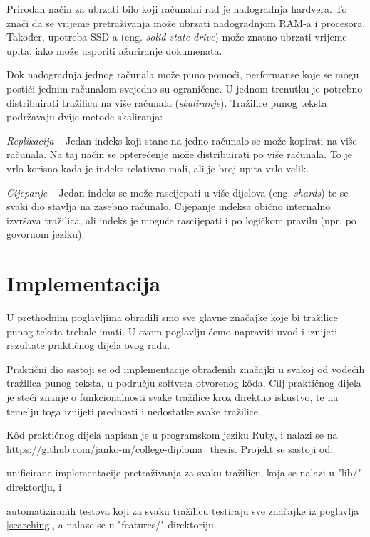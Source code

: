 \documentclass[a4paper,twoside,12pt]{scrreprt}
\begin{document}
Prirodan način za ubrzati bilo koji računalni rad je nadogradnja hardvera. To znači da se vrijeme pretraživanja može ubrzati nadogradnjom RAM-a i procesora. Također, upotreba SSD-a (eng. \textit{solid state drive}) može znatno ubrzati vrijeme upita, iako može usporiti ažuriranje dokumenata.

Dok nadogradnja jednog računala može puno pomoći, performanse koje se mogu postići jednim računalom svejedno su ograničene. U jednom trenutku je potrebno distribuirati tražilicu na više računala (\textit{skaliranje}). Tražilice punog teksta podržavaju dvije metode skaliranja:

\begin{compactenum}
  \item \textit{Replikacija} – Jedan indeks koji stane na jedno računalo se može kopirati na više računala. Na taj način se opterećenje može distribuirati po više računala. To je vrlo korisno kada je indeks relativno mali, ali je broj upita vrlo velik.
  \item \textit{Cijepanje} – Jedan indeks se može rascijepati u više dijelova (eng. \textit{shards}) te se svaki dio stavlja na zasebno računalo. Cijepanje indeksa obično internalno izvršava tražilica, ali indeks je moguće rascijepati i po logičkom pravilu (npr. po govornom jeziku).
\end{compactenum}

\chapter{Implementacija}

U prethodnim poglavljima obradili smo sve glavne značajke koje bi tražilice punog teksta trebale imati. U ovom poglavlju ćemo napraviti uvod i iznijeti rezultate praktičnog dijela ovog rada.

Praktični dio sastoji se od implementacije obrađenih značajki u svakoj od vodećih tražilica punog teksta, u području softvera otvorenog kôda. Cilj praktičnog dijela je steći znanje o funkcionalnosti svake tražilice kroz direktno iskustvo, te na temelju toga iznijeti prednosti i nedostatke svake tražilice.

Kôd praktičnog dijela napisan je u programskom jeziku Ruby, i nalazi se na \url{https://github.com/janko-m/college-diploma_thesis}. Projekt se sastoji od:

\begin{compactenum}
  \item unificirane implementacije pretraživanja za svaku tražilicu, koja se nalazi u "lib/" direktoriju, i
  \item automatiziranih testova koji za svaku tražilicu testiraju sve značajke iz poglavlja \ref{searching}, a nalaze se u "features/" direktoriju.
\end{compactenum}
\end{document}
